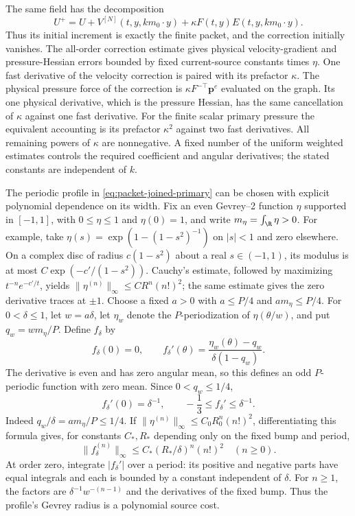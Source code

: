 The same field has the decomposition
\[
 U^+=U+V^{[N]}(t,y,km_0\cdot y)
        +\kappa F(t,y)E(t,y,km_0\cdot y).
\]
Thus its initial increment is exactly the finite packet, and the
correction initially vanishes. The all-order correction estimate gives
physical velocity-gradient and pressure-Hessian errors bounded by fixed
current-source constants times $\eta$. One fast derivative of the velocity correction is paired with its
prefactor $\kappa$. The physical pressure force of the correction is
$\kappa F^{-\top}\mathbf p^e$ evaluated on the graph. Its one
physical derivative, which is the pressure Hessian, has the same
cancellation of $\kappa$ against one fast derivative. For the finite
scalar primary pressure the equivalent accounting is its prefactor
$\kappa^2$ against two fast derivatives. All remaining powers of
$\kappa$ are nonnegative. A fixed number of the uniform weighted
estimates controls the required coefficient and angular derivatives;
the stated constants are independent of $k$.

The periodic profile in \eqref{eq:packet-joined-primary} can be chosen
with explicit polynomial dependence on its width. Fix an even Gevrey--2
function $\eta$ supported in $[-1,1]$, with $0\le\eta\le1$ and
$\eta(0)=1$, and write $m_\eta=\int_\R\eta>0$.
For example, take $\eta(s)=\exp(1-(1-s^2)^{-1})$ on $|s|<1$
and zero elsewhere. On a complex disc of radius $c(1-s^2)$ about
a real $s\in(-1,1)$, its modulus is at most
$C\exp(-c'/(1-s^2))$. Cauchy's estimate, followed by maximizing
$t^{-n}e^{-c'/t}$, yields $\|\eta^{(n)}\|_\infty\le C R^n(n!)^2$;
the same estimate gives the zero derivative traces at $\pm1$.
Choose a fixed $a>0$ with $a\le P/4$ and $am_\eta\le P/4$.
For $0<\delta\le1$, let $w=a\delta$, let $\eta_w$ denote the
$P$-periodization of $\eta(\theta/w)$, and put $q_w=wm_\eta/P$.
Define $f_\delta$ by
\[
 f_\delta(0)=0,\qquad
 f_\delta'(\theta)=\frac{\eta_w(\theta)-q_w}
                            {\delta(1-q_w)}.
\]
The derivative is even and has zero angular mean, so this defines an
odd $P$-periodic function with zero mean. Since $0<q_w\le1/4$,
\[
 f_\delta'(0)=\delta^{-1},\qquad
 -\frac13\le f_\delta'\le\delta^{-1}.
\]
Indeed $q_w/\delta=am_\eta/P\le1/4$. If
$\|\eta^{(n)}\|_\infty\le C_0R_0^n(n!)^2$, differentiating this
formula gives, for constants $C_*,R_*$ depending only on the fixed bump
and period,
\[
 \|f_\delta^{(n)}\|_\infty
       \le C_*(R_*/\delta)^n(n!)^2\quad(n\ge0).
\]
At order zero, integrate $|f_\delta'|$ over a period: its positive and
negative parts have equal integrals and each is bounded by a constant
independent of $\delta$. For $n\ge1$, the factors are
$\delta^{-1}w^{-(n-1)}$ and the derivatives of the fixed bump.
Thus the profile's Gevrey radius is a polynomial source cost.

